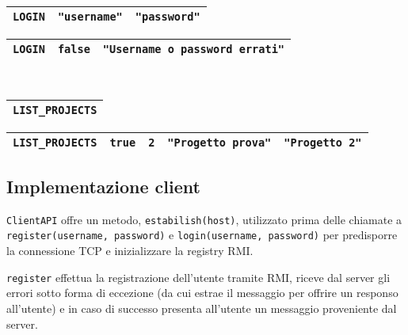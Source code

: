 \documentclass[a4paper,11pt] {article}
\begin{document}
\begin{table}[H]
	\begin{tabular}{|l|l|l|}
		\hline
		\texttt{LOGIN} & \texttt{"username"} & \texttt{"password"} \\ \hline
	\end{tabular}
	\begin{flushright}
	\begin{tabular}{|l|l|l|}
		\hline
		\texttt{LOGIN} & \texttt{false} & \texttt{"Username o password errati"} \\ \hline
	\end{tabular}
	\end{flushright}
	~\\
	\begin{tabular}{|l|}
		\hline
		\texttt{LIST_PROJECTS} \\ \hline
	\end{tabular}
	\begin{flushright}
	\begin{tabular}{|l|l|l|l|l|}
		\hline
		\texttt{LIST_PROJECTS} & \texttt{true} & \texttt{2} & \texttt{"Progetto prova"} & \texttt{"Progetto 2"} \\ \hline
	\end{tabular}
	\end{flushright}
\end{table}

\subsection*{Implementazione client}

\texttt{ClientAPI} offre un metodo, \texttt{estabilish(host)}, utilizzato prima delle chiamate a \linebreak\texttt{register(username, password)} e \texttt{login(username, password)} per predisporre la connessione TCP e inizializzare la registry RMI.

\texttt{register} effettua la registrazione dell'utente tramite RMI, riceve dal server gli errori sotto forma di eccezione (da cui estrae il messaggio per offrire un responso all'utente) e in caso di successo presenta all'utente un messaggio proveniente dal server.
\end{document}
